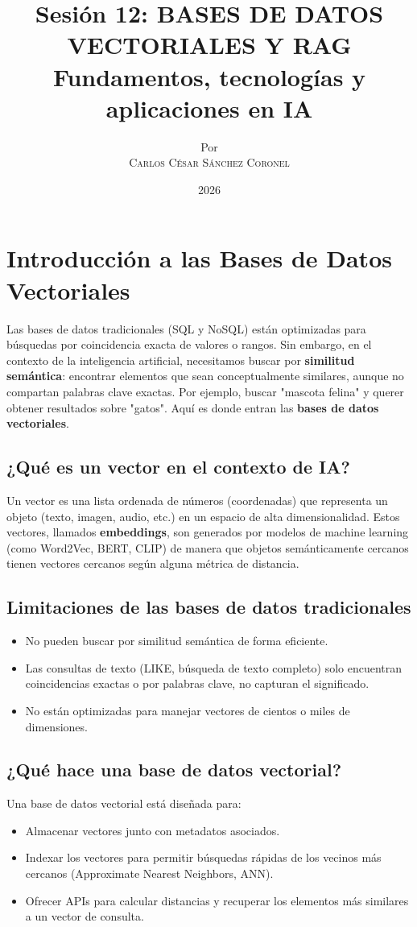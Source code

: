 \documentclass[12pt,a4paper,openany,oneside]{book}
\title{
    \Huge \textbf{Sesión 12: BASES DE DATOS VECTORIALES Y RAG} \\
    \large Fundamentos, tecnologías y aplicaciones en IA
}
\author{
    \small Por \\ \vspace{0.2cm}
    \Large \textsc{Carlos César Sánchez Coronel}
}
\date{2026}
\begin{document}
\maketitle

\tableofcontents
{}

\chapter{Introducción a las Bases de Datos Vectoriales}
Las bases de datos tradicionales (SQL y NoSQL) están optimizadas para búsquedas por coincidencia exacta de valores o rangos. Sin embargo, en el contexto de la inteligencia artificial, necesitamos buscar por \textbf{similitud semántica}: encontrar elementos que sean conceptualmente similares, aunque no compartan palabras clave exactas. Por ejemplo, buscar "mascota felina" y querer obtener resultados sobre "gatos". Aquí es donde entran las \textbf{bases de datos vectoriales}.

\section{¿Qué es un vector en el contexto de IA?}
Un vector es una lista ordenada de números (coordenadas) que representa un objeto (texto, imagen, audio, etc.) en un espacio de alta dimensionalidad. Estos vectores, llamados \textbf{embeddings}, son generados por modelos de machine learning (como Word2Vec, BERT, CLIP) de manera que objetos semánticamente cercanos tienen vectores cercanos según alguna métrica de distancia.

\section{Limitaciones de las bases de datos tradicionales}
\begin{itemize}
    \item No pueden buscar por similitud semántica de forma eficiente.
    \item Las consultas de texto (LIKE, búsqueda de texto completo) solo encuentran coincidencias exactas o por palabras clave, no capturan el significado.
    \item No están optimizadas para manejar vectores de cientos o miles de dimensiones.
\end{itemize}

\section{¿Qué hace una base de datos vectorial?}
Una base de datos vectorial está diseñada para:
\begin{itemize}
    \item Almacenar vectores junto con metadatos asociados.
    \item Indexar los vectores para permitir búsquedas rápidas de los vecinos más cercanos (Approximate Nearest Neighbors, ANN).
    \item Ofrecer APIs para calcular distancias y recuperar los elementos más similares a un vector de consulta.
\end{itemize}
\end{document}
